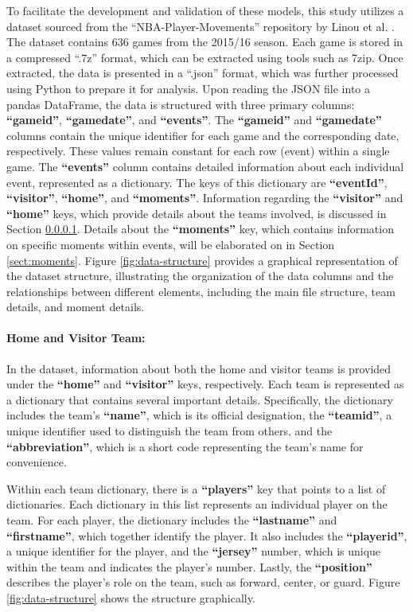 To facilitate the development and validation of these models, this study utilizes a dataset sourced from the ``NBA-Player-Movements'' repository by Linou et al. \cite{linouk}. The dataset contains 636 games from the 2015/16 season. Each game is stored in a compressed ``.7z'' format, which can be extracted using tools such as 7zip. Once extracted, the data is presented in a ``.json'' format, which was further processed using Python to prepare it for analysis. Upon reading the JSON file into a pandas DataFrame, the data is structured with three primary columns: \textbf{``gameid''}, \textbf{``gamedate''}, and \textbf{``events''}. The \textbf{``gameid''} and \textbf{``gamedate''} columns contain the unique identifier for each game and the corresponding date, respectively. These values remain constant for each row (event) within a single game. The \textbf{``events''} column contains detailed information about each individual event, represented as a dictionary. The keys of this dictionary are \textbf{``eventId''}, \textbf{``visitor''}, \textbf{``home''}, and \textbf{``moments''}. Information regarding the \textbf{``visitor''} and \textbf{``home''} keys, which provide details about the teams involved, is discussed in Section \ref{sect:teams}. Details about the \textbf{``moments''} key, which contains information on specific moments within events, will be elaborated on in Section \ref{sect:moments}. Figure \ref{fig:data-structure} provides a graphical representation of the dataset structure, illustrating the organization of the data columns and the relationships between different elements, including the main file structure, team details, and moment details.

\paragraph {Home and Visitor Team:}
\label{sect:teams}

In the dataset, information about both the home and visitor teams is provided under the \textbf{``home''} and \textbf{``visitor''} keys, respectively. Each team is represented as a dictionary that contains several important details. Specifically, the dictionary includes the team's \textbf{``name''}, which is its official designation, the \textbf{``teamid''}, a unique identifier used to distinguish the team from others, and the \textbf{``abbreviation''}, which is a short code representing the team’s name for convenience.

Within each team dictionary, there is a \textbf{``players''} key that points to a list of dictionaries. Each dictionary in this list represents an individual player on the team. For each player, the dictionary includes the \textbf{``lastname''} and \textbf{``firstname''}, which together identify the player. It also includes the \textbf{``playerid''}, a unique identifier for the player, and the \textbf{``jersey''} number, which is unique within the team and indicates the player's number. Lastly, the \textbf{``position''} describes the player’s role on the team, such as forward, center, or guard. Figure \ref{fig:data-structure} shows the structure graphically. 


